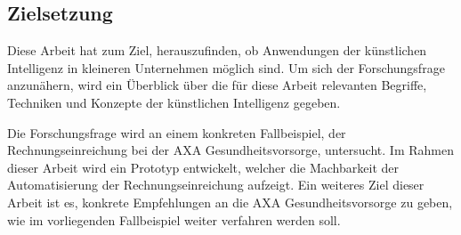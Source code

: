 




\subsection{Zielsetzung}

Diese Arbeit hat zum Ziel, herauszufinden, ob Anwendungen der künstlichen Intelligenz in kleineren Unternehmen möglich sind. Um sich der Forschungsfrage anzunähern, wird ein Überblick über die für diese Arbeit relevanten Begriffe, Techniken und Konzepte der künstlichen Intelligenz gegeben. 

Die Forschungsfrage wird an einem konkreten Fallbeispiel, der Rechnungseinreichung bei der AXA Gesundheitsvorsorge, untersucht. Im Rahmen dieser Arbeit wird ein Prototyp entwickelt, welcher die Machbarkeit der Automatisierung der Rechnungseinreichung aufzeigt. Ein weiteres Ziel dieser Arbeit ist es, konkrete Empfehlungen an die AXA Gesundheitsvorsorge zu geben, wie im vorliegenden Fallbeispiel weiter verfahren werden soll.



